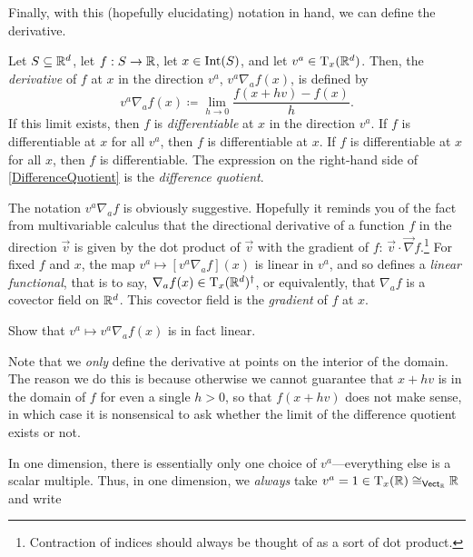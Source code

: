 Finally, with this (hopefully elucidating) notation in hand, we can define the derivative.
\begin{dfn}
\begin{savenotes}
Let $S\subseteq \mathbb{R} ^d$, let $f:S\rightarrow \mathbb{R}$, let $x\in \operatorname{Int} (S)$, and let $v^a\in \tangent[\R ^d][x]$.  Then, the \emph{derivative} of $f$ at $x$ in the direction $v^a$, $v^a\nabla _af(x)$, is defined by
\begin{equation}\label{DifferenceQuotient}
v^a\nabla _af(x)\coloneqq \lim _{h\to 0}\frac{f(x+hv)-f(x)}{h}.
\end{equation}
If this limit exists, then $f$ is \emph{differentiable} at $x$ in the direction $v^a$.  If $f$ is differentiable at $x$ for all $v^a$, then $f$ is differentiable at $x$.  If $f$ is differentiable at $x$ for all $x$, then $f$ is differentiable.  The expression on the right-hand side of \eqref{DifferenceQuotient} is the \emph{difference quotient}.
\begin{rmk}
The notation $v^a\nabla _af$ is obviously suggestive.  Hopefully it reminds you of the fact from multivariable calculus that the directional derivative of a function $f$ in the direction $\vec{v}$ is given by the dot product of $\vec{v}$ with the gradient of $f$:  $\vec{v}\cdot \vec{\nabla}f$.\footnote{Contraction of indices should always be thought of as a sort of dot product.}  For fixed $f$ and $x$, the map $v^a\mapsto [v^a\nabla _af](x)$ is linear in $v^a$, and so defines a \emph{linear functional}, that is to say, $\nabla _af(x)\in \tangent[\R ^d][x]^{\dagger}$, or equivalently, that $\nabla _af$ is a covector field on $\mathbb{R} ^d$.  This covector field is the \emph{gradient} of $f$ at $x$.
\end{rmk}
\begin{exr}\label{exr6.2.4}
Show that $v^a\mapsto v^a\nabla _af(x)$ is in fact linear.
\end{exr}
\begin{rmk}
Note that we \emph{only} define the derivative at points on the interior of the domain.  The reason we do this is because otherwise we cannot guarantee that $x+hv$ is in the domain of $f$ for even a single $h>0$, so that $f(x+hv)$ does not make sense, in which case it is nonsensical to ask whether the limit of the difference quotient exists or not.
\end{rmk}
\begin{rmk}
In one dimension, there is essentially only one choice of $v^a$---everything else is a scalar multiple.  Thus, in one dimension, we \emph{always} take $v^a=1\in \tangent[\R][x]\cong _{\Vect _\R}\R$ and write

\end{rmk}
\end{savenotes}
\end{dfn}
